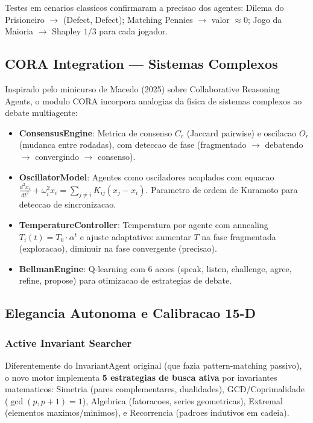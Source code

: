 \documentclass[5p]{elsarticle}
\begin{document}
Testes em cenarios classicos confirmaram a precisao dos agentes: Dilema do
Prisioneiro $\to$ (Defect, Defect); Matching Pennies $\to$ valor $\approx 0$;
Jogo da Maioria $\to$ Shapley $1/3$ para cada jogador.

\subsection{CORA Integration — Sistemas Complexos}

Inspirado pelo minicurso de Macedo (2025) \cite{macedo2025} sobre Collaborative
Reasoning Agents, o modulo CORA incorpora analogias da fisica de sistemas
complexos ao debate multiagente:

\begin{itemize}
  \item \textbf{ConsensusEngine}: Metrica de consenso $C_r$ (Jaccard pairwise)
    e oscilacao $O_r$ (mudanca entre rodadas), com deteccao de fase
    (fragmentado $\to$ debatendo $\to$ convergindo $\to$ consenso).
  \item \textbf{OscillatorModel}: Agentes como osciladores acoplados com
    equacao $\frac{d^2x_i}{dt^2}+\omega_i^2x_i=\sum_{j\neq i}K_{ij}(x_j-x_i)$.
    Parametro de ordem de Kuramoto para deteccao de sincronizacao.
  \item \textbf{TemperatureController}: Temperatura por agente com annealing
    $T_i(t)=T_0\cdot\alpha^t$ e ajuste adaptativo: aumentar $T$ na fase
    fragmentada (exploracao), diminuir na fase convergente (precisao).
  \item \textbf{BellmanEngine}: Q-learning \cite{bellman1954,sutton1998} com
    6 acoes (speak, listen, challenge, agree, refine, propose) para otimizacao
    de estrategias de debate.
\end{itemize}

\subsection{Elegancia Autonoma e Calibracao 15-D}

\subsubsection{Active Invariant Searcher}

Diferentemente do InvariantAgent original (que fazia pattern-matching passivo),
o novo motor implementa \textbf{5 estrategias de busca ativa} por invariantes
matematicos: Simetria (pares complementares, dualidades), GCD/Coprimalidade
($\gcd(p,p+1)=1$), Algebrica (fatoracoes, series geometricas), Extremal
(elementos maximos/minimos), e Recorrencia (padroes indutivos em cadeia).
\end{document}
